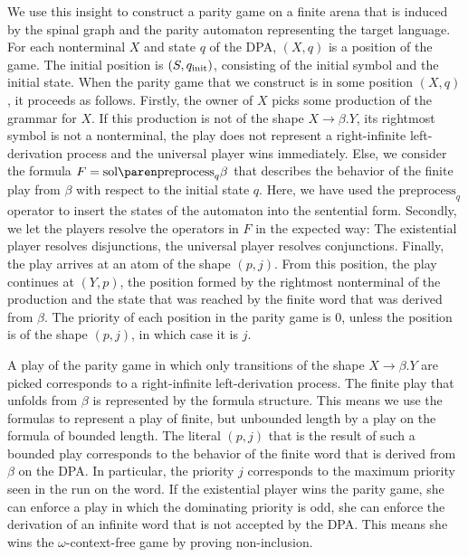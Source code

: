 \documentclass[../../diss.tex]{subfiles}
\begin{document}
We use this insight to construct a parity game on a finite arena that is induced by the spinal graph and the parity automaton representing the target language.
For each nonterminal $X$ and state $q$ of the DPA, $(X,q)$ is a position of the game.
The initial position is $(S,q_{\text{init}})$, consisting of the initial symbol and the initial state.
When the parity game that we construct is in some position $(X,q)$, it proceeds as follows.
Firstly, the owner of $X$ picks some production of the grammar for $X$.
If this production is not of the shape $X \to \beta.Y$, \ie its rightmost symbol is not a nonterminal, the play does not represent a right-infinite left-derivation process and the universal player wins immediately.
Else, we consider the formula $F = \sol{ \text{preprocess}_q{\beta} }$ that describes the behavior of the finite play from $\beta$ with respect to the initial state $q$.
Here, we have used the $\text{preprocess}_q$ operator to insert the states of the automaton into the sentential form.
Secondly, we let the players resolve the operators in $F$ in the expected way: The existential player resolves disjunctions, the universal player resolves conjunctions.
Finally, the play arrives at an atom of the shape $(p,j)$.
From this position, the play continues at $(Y,p)$, the position formed by the rightmost nonterminal of the production and the state that was reached by the finite word that was derived from $\beta$.
The priority of each position in the parity game is $0$, unless the position is of the shape $(p,j)$, in which case it is $j$.

A play of the parity game in which only transitions of the shape $X \to \beta.Y$ are picked corresponds to a right-infinite left-derivation process.
The finite play that unfolds from $\beta$ is represented by the formula structure.
This means we use the formulas to represent a play of finite, but unbounded length by a play on the formula of bounded length.
The literal $(p,j)$ that is the result of such a bounded play corresponds to the behavior of the finite word that is derived from $\beta$ on the DPA.\@
In particular, the priority $j$ corresponds to the maximum priority seen in the run on the word.
If the existential player wins the parity game, \ie she can enforce a play in which the dominating priority is odd, she can enforce the derivation of an infinite word that is not accepted by the DPA.\@
This means she wins the $\omega$-context-free game by proving non-inclusion.
\end{document}
